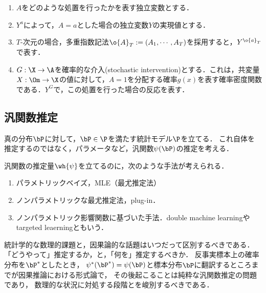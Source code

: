 \documentclass[uplatex,dvipdfmx]{jsreport}
\begin{document}
\begin{notation}\mbox{}
    \begin{enumerate}
        \item $A$をどのような処置を行ったかを表す独立変数とする．
        \item $Y^a$によって，$A=a$とした場合の独立変数$Y$の実現値とする．
        \item $T$-次元の場合，多重指数記法$\o{A}_T:=(A_1,\cdots,A_T)$を採用すると，$Y^{\o{a}_T}$で表す．
        \item $G:\X\to\A$を確率的な介入(stochastic intervention)とする．これは，共変量$X:\Om\to\X$の値に対して，$A=1$を分配する確率$g(x)$を表す確率密度関数である．$Y^G$で，この処置を行った場合の反応を表す．
    \end{enumerate}
\end{notation}

\subsection{汎関数推定}

\begin{notation}
    真の分布$\bP$に対して，$\bP\in\P$を満たす統計モデル$\P$を立てる．
    これ自体を推定するのではなく，パラメータなど，汎関数$\psi(\bP)$の推定を考える．
\end{notation}

\begin{example}
    汎関数の推定量$\wh{\psi}$を立てるのに，次のような手法が考えられる．
    \begin{enumerate}
        \item パラメトリックベイズ，MLE（最尤推定法）
        \item ノンパラメトリックな最尤推定法，plug-in．
        \item ノンパラメトリック影響関数に基づいた手法．double machine learningやtargeted leaerningともいう．
    \end{enumerate}
\end{example}

\begin{remark}
    統計学的な数理的課題と，因果論的な話題はいつだって区別するべきである．
    「どうやって」推定するか，と，「何を」推定するべきか．
    反事実標本上の確率分布を$\bP^*$としたとき，
    $\psi^*(\bP^*)=\psi(\bP)$と標本分布$\bP$に翻訳するところまでが因果推論における形式論で，
    その後起こることは純粋な汎関数推定の問題であり，
    数理的な状況に対処する段階とを峻別するべきである．
\end{remark}
\end{document}
